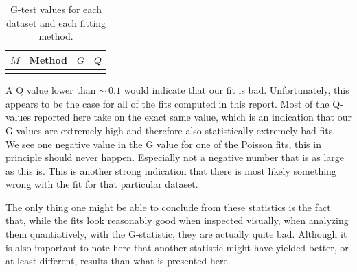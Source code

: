 \begin{table}[h]
    \centering
    \begin{tabular}{|c|c|c|c|}
    \hline
    $M$ & Method & $G$ & $Q$ \\
    \hline
     \\
    \hline
    \end{tabular}
    \caption{G-test values for each dataset and each fitting method.}
    \label{tab:stats}
\end{table}

A Q value lower than $\sim~0.1$ would indicate that our fit is bad. Unfortunately, this appears to be the case for all of the fits computed in this report. Most of the Q-values reported here take on the exact same value, which is an indication that our G values are extremely high and therefore also statistically extremely bad fits. We see one negative value in the G value for one of the Poisson fits, this in principle should never happen. Especially not a negative number that is as large as this is. This is another strong indication that there is most likely something wrong with the fit for that particular dataset. 

The only thing one might be able to conclude from these statistics is the fact that, while the fits look reasonably good when inspected visually, when analyzing them quantiatively, with the G-statistic, they are actually quite bad. Although it is also important to note here that another statistic might have yielded better, or at least different, results than what is presented here.


\newpage


